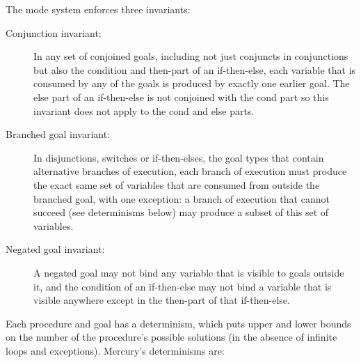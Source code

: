 The mode system enforces three invariants:

\begin{description}

  \item[Conjunction invariant:]
  In any set of conjoined goals,
  including not just conjuncts in conjunctions
  but also the condition and then-part of an if-then-else,
  each variable that is consumed by any of the goals
  is produced by exactly one earlier goal.
  The else part of an if-then-else is not conjoined with the cond part
  so this invariant does not apply to the cond and else parts.

  \item[Branched goal invariant:]
  In disjunctions, switches or if-then-elses,
  the goal types that contain alternative branches of execution,
  each branch of execution must produce
  the exact same set of variables
  that are consumed from outside the branched goal,
  with one exception:
  a branch of execution that cannot succeed (see determinisms below)
  may produce a subset of this set of variables.
  
  \item[Negated goal invariant:]
  A negated goal may not bind
  any variable that is visible to goals outside it,
  and the condition of an if-then-else may not bind a variable
  that is visible anywhere except in
  the then-part of that if-then-else.

\end{description}

\noindent
Each procedure and goal has a determinism,
which puts upper and lower bounds on the number of the procedure's possible
solutions
(in the absence of infinite loops and exceptions).
Mercury's determinisms are:

